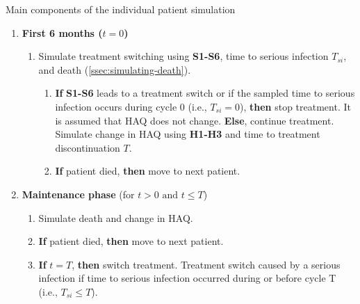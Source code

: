 \documentclass[11pt,final,fleqn]{article}\usepackage[]{graphicx}\usepackage[]{color}
\theoremstyle{plain}
\begin{document}
\begin{algorithm}
\caption{Main components of the individual patient simulation}
\label{alg:IPS}
\begin{enumerate}
\item \textbf{First 6 months ($t = 0$)}
\begin{enumerate}
\item Simulate treatment switching using \textbf{S1-S6}, time to serious infection $T_{si}$, and death (\autoref{ssec:simulating-death}).
\begin{enumerate}
\item \textbf{If} \textbf{S1-S6} leads to a treatment switch or if the sampled time to serious infection occurs during cycle 0 (i.e., $T_{si} = 0$), \textbf{then} stop treatment. It is assumed that HAQ does not change.
\newline \textbf{Else}, continue treatment. Simulate change in HAQ using \textbf{H1-H3} and time to treatment discontinuation $T$.
\item \textbf{If} patient died, \textbf{then} move to next patient. 
\end{enumerate}
\end{enumerate}
\item \textbf{Maintenance phase} (for $t > 0 \text{ and } t \leq T$)
\begin{enumerate}
\item Simulate death and change in HAQ.
\item \textbf{If} patient died, \textbf{then} move to next patient.
\item \textbf{If} $t = T$, \textbf{then} switch treatment. Treatment switch caused by a serious infection if time to serious infection occurred during or before cycle T (i.e., $T_{si} \leq T$). 
\end{enumerate}
\end{enumerate}
\end{algorithm}
\end{document}
